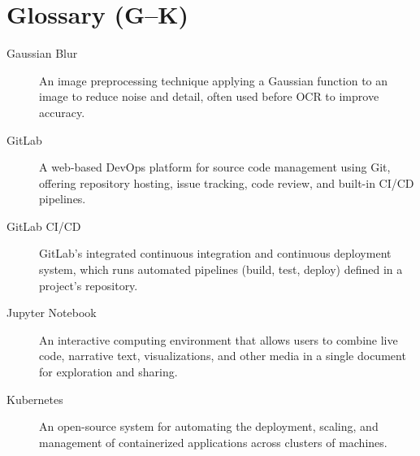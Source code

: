 \section*{Glossary (G–K)}
\begin{description}
  \item[Gaussian Blur] 
    An image preprocessing technique applying a Gaussian function to an image to 
    reduce noise and detail, often used before OCR to improve accuracy.
  \item[GitLab] 
    A web-based DevOps platform for source code management using Git, offering 
    repository hosting, issue tracking, code review, and built-in CI/CD pipelines.
  \item[GitLab CI/CD] 
    GitLab’s integrated continuous integration and continuous deployment system, 
    which runs automated pipelines (build, test, deploy) defined in a project’s repository.
  \item[Jupyter Notebook] 
    An interactive computing environment that allows users to combine live code, 
    narrative text, visualizations, and other media in a single document for exploration and sharing.
  \item[Kubernetes] 
    An open-source system for automating the deployment, scaling, and management of 
    containerized applications across clusters of machines.
\end{description}
